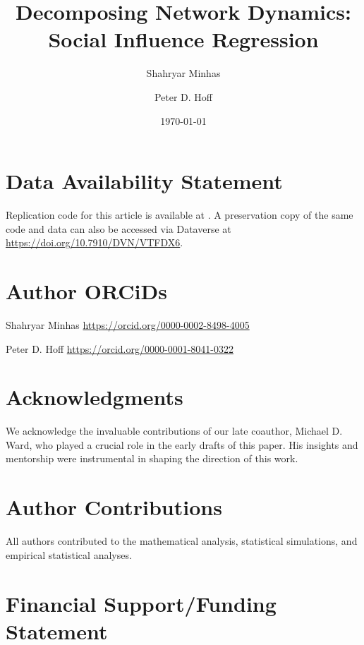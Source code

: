 \documentclass[12pt,onesided]{amsart}
\title{Decomposing Network Dynamics: Social Influence Regression}
\author[Minhas]{Shahryar Minhas}
\author[Hoff]{Peter D. Hoff}
\date{\today}
\begin{document}
\maketitle\thispagestyle{empty}

\small{\singlespacing{
\begin{abstract}

\end{abstract}
}}

\newpage\setcounter{page}{1}






\clearpage 

\section*{Data Availability Statement}

Replication code for this article is available at \citet{minhas:hoff:2025}. A preservation copy of the same code and data can also be accessed via Dataverse at \url{https://doi.org/10.7910/DVN/VTFDX6}.

\section*{Author ORCiDs}

Shahryar Minhas \url{https://orcid.org/0000-0002-8498-4005}

Peter D. Hoff \url{https://orcid.org/0000-0001-8041-0322}

\section*{Acknowledgments}

We acknowledge the invaluable contributions of our late coauthor, Michael D. Ward, who played a crucial role in the early drafts of this paper. His insights and mentorship were instrumental in shaping the direction of this work.

\section*{Author Contributions}

All authors contributed to the mathematical analysis, statistical simulations, and empirical statistical analyses.

\section*{Financial Support/Funding Statement}
\end{document}
